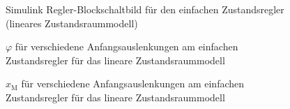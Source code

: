 \begin{figure}[H]
    \centering
    \caption[Einfacher Zustandsregler Simulink (linear)]{Simulink Regler-Blockschaltbild für den einfachen Zustandsregler (lineares Zustandsraummodell)}
    \label{fig:Bild13}
\end{figure}

\begin{figure}[H]
    \centering
    \caption[$\varphi$ für einfachen Zustandsregler (linear)]{$\varphi$ für verschiedene Anfangsauslenkungen am einfachen Zustandsregler für das lineare Zustandsraummodell}
    \label{fig:Bild14}
\end{figure}

\begin{figure}[H]
    \centering
    \caption[$x_{\mathrm{M}}$ für einfachen Zustandsregler (linear)]{$x_{\mathrm{M}}$ für verschiedene Anfangsauslenkungen am einfachen Zustandsregler für das lineare Zustandsraummodell}
    \label{fig:Bild15}
\end{figure}

